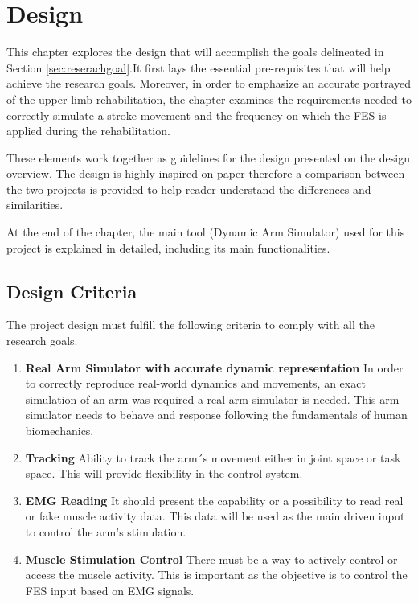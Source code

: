 \chapter{Design} \label{Design}

This chapter explores the design that will accomplish the goals delineated in Section \ref{sec:reserachgoal}.It first lays the essential pre-requisites that will help achieve the research goals. Moreover, in order to emphasize an accurate portrayed of the upper limb rehabilitation, the chapter examines the requirements needed to correctly simulate a stroke movement and the frequency on which the FES is applied during the rehabilitation. 

These elements work together as guidelines for the design presented on the design overview. The design is highly inspired on paper \cite{QSC} therefore a comparison between the two projects is provided to help reader understand the differences and similarities.

At the end of the chapter, the main tool (Dynamic Arm Simulator) used for this project is explained in detailed, including its main functionalities.


\section{Design Criteria} 

The project design must fulfill the following criteria to comply with all the research goals.

\begin{enumerate}
    \item \textbf{Real Arm Simulator with accurate dynamic representation} In order to correctly reproduce real-world dynamics and movements, an exact simulation of an arm was required a real arm simulator is needed. This arm simulator needs to behave and response following the fundamentals of human biomechanics.
    \item \textbf{Tracking} Ability to track the arm´s movement either in joint space or task space. This will provide flexibility in the control system. 
    \item \textbf{EMG Reading} It should present the capability or a possibility to read real or fake muscle activity data. This data will be used as the main driven input to control the arm's stimulation.
    \item \textbf{Muscle Stimulation Control} There must be a way to actively control or access the muscle activity. This is important as the objective is to control the FES input based on EMG signals. 
    
\end{enumerate}

